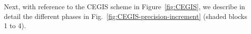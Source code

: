 \documentclass[twocolumn]{autart}    %
\newtheorem{theorem}{Theorem}
\newtheorem{proof}{Proof}
\renewcommand{\note}[1]{\textcolor{red}{[#1]}}
\begin{document}
%
%

Next, 
with reference to the CEGIS scheme in Figure~\ref{fig:CEGIS}, 
we describe in detail the different phases in Fig.~\ref{fig:CEGIS-precision-increment} (shaded blocks 1 to 4). 

\end{document}
